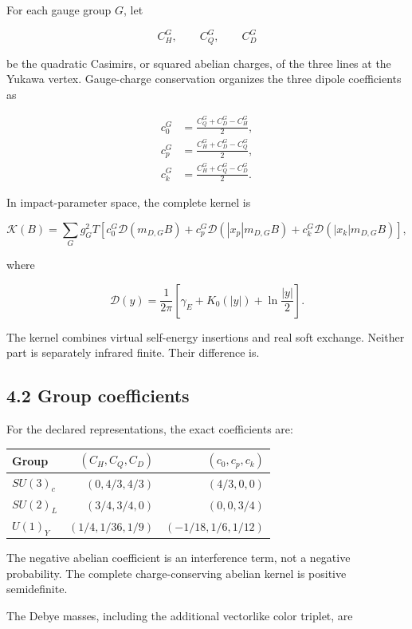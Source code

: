 \documentclass[
  10pt,
]{article}
\begin{document}
For each gauge group \(G\), let

\[
C_H^G,
\qquad
C_Q^G,
\qquad
C_D^G
\]

be the quadratic Casimirs, or squared abelian charges, of the three
lines at the Yukawa vertex. Gauge-charge conservation organizes the
three dipole coefficients as

\[
\boxed{
\begin{aligned}
c_0^G&=\frac{C_Q^G+C_D^G-C_H^G}{2},\\
c_p^G&=\frac{C_H^G+C_D^G-C_Q^G}{2},\\
c_k^G&=\frac{C_H^G+C_Q^G-C_D^G}{2}.
\end{aligned}
}
\]

In impact-parameter space, the complete kernel is

\[
\boxed{
\mathcal K(B)
=
\sum_G g_G^2T
\left[
 c_0^G\mathcal D(m_{D,G}B)
+c_p^G\mathcal D(|x_p|m_{D,G}B)
+c_k^G\mathcal D(|x_k|m_{D,G}B)
\right],
}
\]

where

\[
\mathcal D(y)
=
\frac{1}{2\pi}
\left[
\gamma_E+K_0(|y|)+\ln\frac{|y|}{2}
\right].
\]

The kernel combines virtual self-energy insertions and real soft
exchange. Neither part is separately infrared finite. Their difference
is.

\subsection{4.2 Group coefficients}\label{group-coefficients}

For the declared representations, the exact coefficients are:

\begin{longtable}[]{@{}lrr@{}}
\toprule\noalign{}
Group & \((C_H,C_Q,C_D)\) & \((c_0,c_p,c_k)\) \\
\midrule\noalign{}
\endhead
\bottomrule\noalign{}
\endlastfoot
\(SU(3)_c\) & \((0,4/3,4/3)\) & \((4/3,0,0)\) \\
\(SU(2)_L\) & \((3/4,3/4,0)\) & \((0,0,3/4)\) \\
\(U(1)_Y\) & \((1/4,1/36,1/9)\) & \((-1/18,1/6,1/12)\) \\
\end{longtable}

The negative abelian coefficient is an interference term, not a negative
probability. The complete charge-conserving abelian kernel is positive
semidefinite.

The Debye masses, including the additional vectorlike color triplet, are
\end{document}

